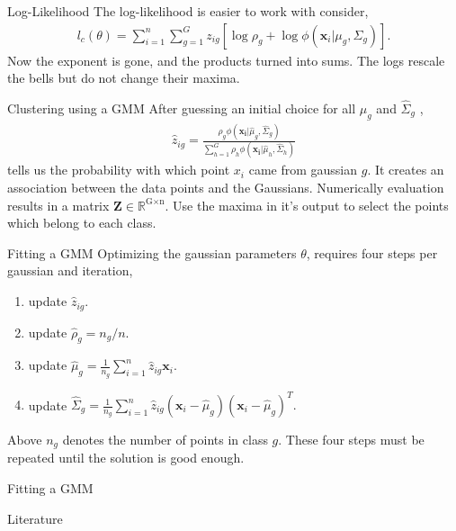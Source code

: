 \documentclass{beamer}
\begin{document}
    \begin{frame}{Log-Likelihood}
      The log-likelihood is easier to work with consider, 
      \begin{align}
      l_c(\theta) = \sum_{i=1}^{n}\sum_{g=1}^{G} z_{ig} [\log \rho_g + \log \phi(\mathbf{x}_i|\mu_g, \Sigma_g)].
      \end{align}
      Now the exponent is gone, and the products turned into sums. The logs rescale the bells but do not change their maxima.
    \end{frame}


    \begin{frame}{Clustering using a GMM}
      After guessing an initial choice for all $\hat{\mu}_g$ and $\hat{\Sigma}_g$ \cite{mcnicholas2016mixture},
      \begin{align}
      \hat{z}_{ig} = \frac{\rho_g \phi(\mathbf{x_i}| \hat{\mu}_g, \hat{\Sigma}_g)}{\sum_{h=1}^G \rho_h \phi(\mathbf{x_i}| \hat{\mu}_h, \hat{\Sigma}_h) }
      \end{align}
      tells us the probability with which point $x_i$ came from gaussian $g$. It creates an association between the data points and the Gaussians. Numerically evaluation results in a matrix $\mathbf{Z} \in \mathbb{R}^{\text{G} \times \text{n}}$. Use the maxima in it's output to select the points which belong to each class.
    \end{frame}

    \begin{frame}{Fitting a GMM}
      Optimizing the gaussian parameters $\theta$, requires four steps per gaussian and iteration,
      \begin{enumerate}
        \item update $\hat{z}_{ig}.$
        \item update $\hat{\rho}_g = n_g/n.$
        \item update $\hat{\mu}_g = \frac{1}{n_g} \sum_{i=1}^n \hat{z}_{ig} \mathbf{x}_i.$
        \item update $\hat{\Sigma}_g = \frac{1}{n_g} \sum_{i=1}^n \hat{z}_{ig} (\mathbf{x}_i - \hat{\mu}_g)(\mathbf{x}_i - \hat{\mu}_g)^T.$
     \end{enumerate}
      Above $n_g$ denotes the number of points in class $g$. These four steps must be repeated until the solution is good enough.
    \end{frame}

    \begin{frame}{Fitting a GMM}
    \end{frame}

    \begin{frame}{Literature}
      \printbibliography
    \end{frame}
\end{document}
